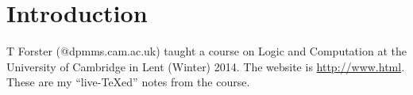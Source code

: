 \def\filepath{C:/Users/Owner/Dropbox/Math/templates}








\def\name{Logic and computation}



\pagestyle{fancy}
\chead{} 
\lfoot{} 
\cfoot{\thepage} 
\rfoot{} %
\renewcommand{\headrulewidth}{.3pt} 
\setlength\voffset{0in}
\setlength\textheight{648pt}


\maketitle
\tableofcontents

\chapter*{Introduction}
T Forster (@dpmms.cam.ac.uk) taught a course on Logic and Computation at
the University of Cambridge in Lent (Winter) 2014. The website is \url{http://www.html}.  
These are my ``live-\TeX ed'' notes from the course.







\printnomenclature
\printindex
